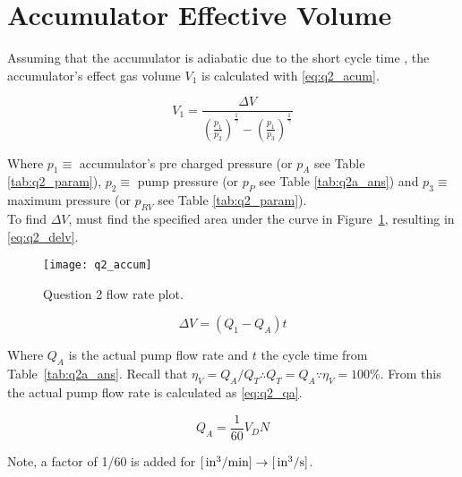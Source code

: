 \pagebreak

\section{Accumulator Effective Volume}

Assuming that the accumulator is adiabatic due to the short cycle time \cite{notes}, the accumulator's effect gas volume $V_1$ is calculated with \ref{eq:q2_acum}.

\begin{equation}
	\label{eq:q2_acum}
	V_1 = \frac{\Delta V}{\left( \frac{p_1}{p_2} \right)^{\frac{1}{\gamma}} -\left( \frac{p_1}{p_3}\right)^{\frac{1}{\gamma}}}
\end{equation}

Where $p_1 \equiv$ accumulator's pre charged pressure (or $p_A$ see Table \ref{tab:q2_param}), $p_2 \equiv$ pump pressure (or $p_P$ see Table \ref{tab:q2a_ans}) and $p_3 \equiv$ maximum pressure (or $p_{RV}$ see Table \ref{tab:q2_param}).\\


To find $\Delta V$, must find the specified area under the curve in Figure~\ref{fig:q2_accum}, resulting in  \ref{eq:q2_delv}.
\begin{figure}[H]
	\centering
	\texttt{[image: q2\_accum]}
	\caption{Question 2 flow rate plot.}
	\label{fig:q2_accum}
\end{figure}

\begin{equation}
	\label{eq:q2_delv}
	\Delta V = \left( Q_1 - Q_A \right)t
\end{equation}

Where $Q_A$ is the actual pump flow rate and $t$ the cycle time from Table~\ref{tab:q2a_ans}. Recall that $\eta_V = Q_A/Q_T \therefore Q_T = Q_A \because \eta_V = 100 \% $. From this the actual pump flow rate is calculated as \ref{eq:q2_qa}.

\begin{equation}
	\label{eq:q2_qa}
	Q_A = \frac{1}{60} V_D N
\end{equation}

Note, a factor of 1/60 is added for $[\,\mathrm{in^3/min}] \rightarrow [\,\mathrm{in^3/s}]$.\\


